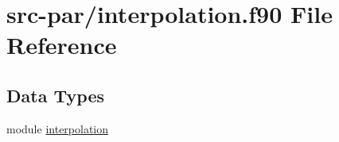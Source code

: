 \hypertarget{interpolation_8f90}{\section{src-\/par/interpolation.f90 File Reference}
\label{interpolation_8f90}
}
\subsection*{Data Types}
\begin{DoxyCompactItemize}
\item 
module \hyperlink{classinterpolation}{interpolation}
\end{DoxyCompactItemize}
